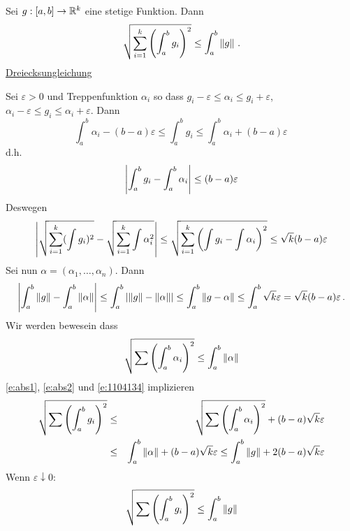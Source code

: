  \begin{Lem}\label{l:int_drei}
  Sei $g:[a,b]\rightarrow\mathbb{R}^k$ eine stetige Funktion. Dann
  \[\sqrt{\sum_{i=1}^k\left( \int_a^bg_i \right)^2}\leq\int_a^b\left\| g \right\|\, .\]
  \ul{Dreiecksungleichung}
\end{Lem}
\begin{Bew}
  Sei $\varepsilon>0$ und Treppenfunktion $\alpha_i$ so dass $g_i-\varepsilon\leq\alpha_i\leq g_i+\varepsilon$, $\alpha_i-\varepsilon\leq g_i\leq \alpha_i+\varepsilon$. Dann
 \[\int_a^b\alpha_i-(b-a)\varepsilon
    \leq\int_a^b g_i \leq \int_a^b\alpha_i+(b-a)\varepsilon\, 
\]
d.h.
  \[\left| \int_a^bg_i-\int_a^b\alpha_i \right|\leq (b-a)\varepsilon\]
Deswegen
\begin{equation}\label{e:abs1}  
 \left| \sqrt{\sum_{i=1}^k(\int g_i)^2}-\sqrt{\sum_{i=1}^k \int\alpha_i^2} \right|
    \leq\sqrt{\sum_{i=1}^k \left(\int g_i-\int \alpha_i\right)^2}
    \leq \sqrt{k}(b-a)\varepsilon
  \end{equation}
Sei nun $\alpha = (\alpha_1, \ldots, \alpha_n)$. Dann
  \begin{equation}\label{e:abs2}
    \left| \int_a^b\left\| g \right\|-\int_a^b\left\| \alpha \right\| \right|
    \leq\int_a^b\left| \left\| g \right\|-\left\| \alpha \right\| \right|
    \leq\int_a^b\left\| g-\alpha \right\|
    \leq\int_a^b\sqrt{k}\varepsilon
    =\sqrt{k} (b-a)\varepsilon\, .
  \end{equation}
 Wir werden bewesein dass
    \begin{equation}
      \label{e:1104134}
      \sqrt{\sum\left(\int_a^b\alpha_i\right)^2}\leq\int_a^b\left\| \alpha \right\|
    \end{equation}
 \eqref{e:abs1}, \eqref{e:abs2} und \eqref{e:1104134} implizieren
  \begin{eqnarray*}
    \sqrt{\sum\left(\int_a^b g_i\right)^2}&\leq&
\sqrt{\sum\left(\int_a^b\alpha_i\right)^2}+(b-a)\sqrt{k}\varepsilon \\
    &\leq&\int_a^b\left\| \alpha \right\|+(b-a)\sqrt{k}\varepsilon
    \leq\int_a^b\left\| g \right\|+2(b-a)\sqrt{k}\varepsilon
  \end{eqnarray*}
  Wenn $\varepsilon\downarrow 0$:
  \[\sqrt{\sum\left( \int_a^bg_i \right)^2}\leq\int_a^b\left\| g \right\|\]

\medskip


\end{Bew}
